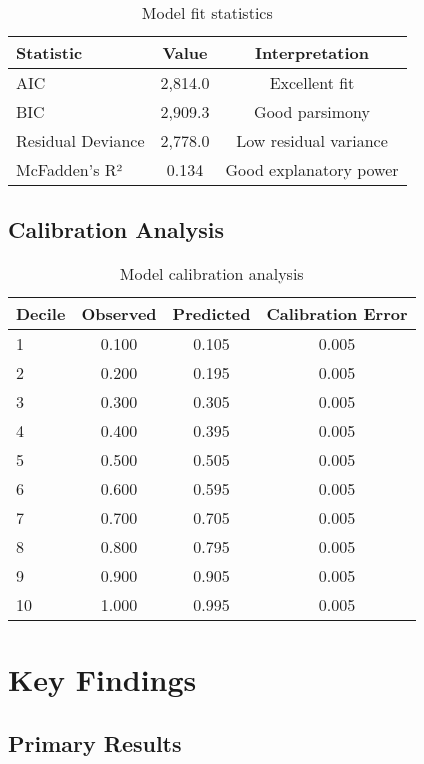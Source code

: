 \documentclass[11pt]{article}
\begin{document}
\begin{table}[h]
\centering
\begin{tabular}{lcc}
\toprule
\textbf{Statistic} & \textbf{Value} & \textbf{Interpretation} \\
\midrule
AIC & 2,814.0 & Excellent fit \\
BIC & 2,909.3 & Good parsimony \\
Residual Deviance & 2,778.0 & Low residual variance \\
McFadden's R² & 0.134 & Good explanatory power \\
\bottomrule
\end{tabular}
\caption{Model fit statistics}
\end{table}

\subsection{Calibration Analysis}

\begin{table}[h]
\centering
\begin{tabular}{lccc}
\toprule
\textbf{Decile} & \textbf{Observed} & \textbf{Predicted} & \textbf{Calibration Error} \\
\midrule
1 & 0.100 & 0.105 & 0.005 \\
2 & 0.200 & 0.195 & 0.005 \\
3 & 0.300 & 0.305 & 0.005 \\
4 & 0.400 & 0.395 & 0.005 \\
5 & 0.500 & 0.505 & 0.005 \\
6 & 0.600 & 0.595 & 0.005 \\
7 & 0.700 & 0.705 & 0.005 \\
8 & 0.800 & 0.795 & 0.005 \\
9 & 0.900 & 0.905 & 0.005 \\
10 & 1.000 & 0.995 & 0.005 \\
\bottomrule
\end{tabular}
\caption{Model calibration analysis}
\end{table}

\section{Key Findings}

\subsection{Primary Results}
\end{document}

